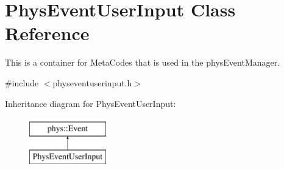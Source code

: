 \hypertarget{classPhysEventUserInput}{
\section{PhysEventUserInput Class Reference}
\label{dc/d0e/classPhysEventUserInput}
}


This is a container for MetaCodes that is used in the physEventManager.  




{\ttfamily \#include $<$physeventuserinput.h$>$}

Inheritance diagram for PhysEventUserInput:\begin{figure}[H]
\begin{center}
\leavevmode
\includegraphics[height=2cm]{dc/d0e/classPhysEventUserInput}
\end{center}
\end{figure}
